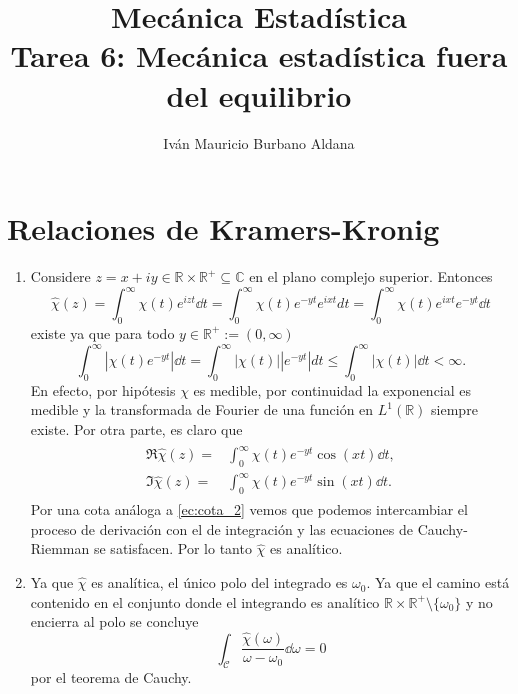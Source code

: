 \documentclass{article}
\title{Mecánica Estadística\\
Tarea 6: Mecánica estadística fuera del equilibrio}
\author{Iván Mauricio Burbano Aldana}
\begin{document}
\maketitle

\section{Relaciones de Kramers-Kronig}

\begin{enumerate}

\item Considere $z=x+iy\in\mathbb{R}\times\mathbb{R}^+\subseteq\mathbb{C}$ en el plano complejo superior. Entonces
\begin{equation}
\hat{\chi}(z)=\int_0^\infty\chi(t)e^{izt}\dd{t}=\int_0^\infty\chi(t)e^{-yt}e^{ixt}dt=\int_0^\infty\chi(t)e^{ixt}e^{-yt}\dd{t}
\end{equation} 
existe ya que para todo $y\in\mathbb{R}^+:=(0,\infty)$
\begin{equation}\label{ec:cota_2}
\int_0 ^\infty |\chi(t)e^{-yt}| \dd{t}=\int_0 ^\infty |\chi(t)||e^{-yt}| dt\leq\int_0 ^\infty |\chi(t)| \dd{t}<\infty.
\end{equation}
En efecto, por hipótesis $\chi$ es medible, por continuidad la exponencial es medible y la transformada de Fourier de una función en $L^1(\mathbb{R})$ siempre existe\cite{Rudin1987}. Por otra parte, es claro que
\begin{align}
\begin{split}
\Re\hat{\chi}(z)=&\int_0^\infty\chi(t)e^{-yt}\cos(xt)\dd{t},\\
\Im\hat{\chi}(z)=&\int_0^\infty\chi(t)e^{-yt}\sin(xt)\dd{t}.
\end{split}
\end{align}
Por una cota análoga a \eqref{ec:cota_2} vemos que podemos intercambiar el proceso de derivación con el de integración y las ecuaciones de Cauchy-Riemman se satisfacen\cite{Rudin1987}. Por lo tanto $\hat{\chi}$ es analítico.

\item Ya que $\hat{\chi}$ es analítica, el único polo del integrado es $\omega_0$. Ya que el camino está contenido en el conjunto donde el integrando es analítico $\mathbb{R}\times\mathbb{R}^+\setminus\{\omega_0\}$ y no encierra al polo se concluye
\begin{equation}
\int_\mathcal{C}\frac{\hat{\chi}(\omega)}{\omega-\omega_0}\dd{\omega}=0
\end{equation}
por el teorema de Cauchy.


\end{enumerate}
\end{document}
